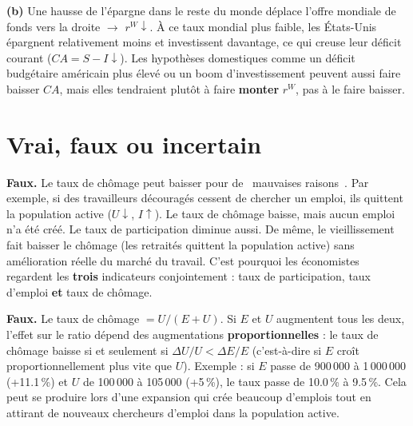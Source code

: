 \begin{reponse}
\textbf{(b)} Une hausse de l'épargne dans le reste du monde déplace l'offre mondiale de fonds vers la droite $\to$ $r^W \downarrow$. À ce taux mondial plus faible, les États-Unis épargnent relativement moins et investissent davantage, ce qui creuse leur déficit courant ($CA = S - I \downarrow$). Les hypothèses domestiques comme un déficit budgétaire américain plus élevé ou un boom d'investissement peuvent aussi faire baisser $CA$, mais elles tendraient plutôt à faire \textbf{monter} $r^W$, pas à le faire baisser.
\end{reponse}

\section{Vrai, faux ou incertain}

\setcounter{shortcounter}{0}



\begin{reponse}
\textbf{Faux.} Le taux de chômage peut baisser pour de \guillemotleft~mauvaises raisons~\guillemotright. Par exemple, si des travailleurs découragés cessent de chercher un emploi, ils quittent la population active ($U \downarrow$, $I \uparrow$). Le taux de chômage baisse, mais aucun emploi n'a été créé. Le taux de participation diminue aussi. De même, le vieillissement fait baisser le chômage (les retraités quittent la population active) sans amélioration réelle du marché du travail. C'est pourquoi les économistes regardent les \textbf{trois} indicateurs conjointement : taux de participation, taux d'emploi \textbf{et} taux de chômage.
\end{reponse}


\begin{reponse}
\textbf{Faux.} Le taux de chômage $= U/(E+U)$. Si $E$ et $U$ augmentent tous les deux, l'effet sur le ratio dépend des augmentations \textbf{proportionnelles} : le taux de chômage baisse si et seulement si $\Delta U / U < \Delta E / E$ (c'est-à-dire si $E$ croît proportionnellement plus vite que $U$). Exemple : si $E$ passe de 900\,000 à 1\,000\,000 (+11.1\,\%) et $U$ de 100\,000 à 105\,000 (+5\,\%), le taux passe de 10.0\,\% à 9.5\,\%. Cela peut se produire lors d'une expansion qui crée beaucoup d'emplois tout en attirant de nouveaux chercheurs d'emploi dans la population active.
\end{reponse}

